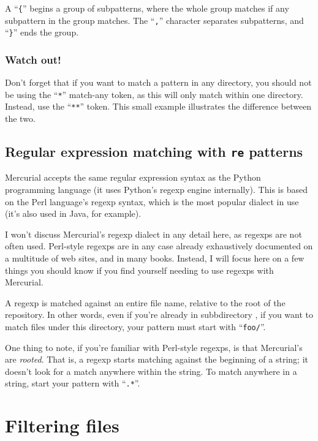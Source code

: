 A ``\texttt{\{}'' begins a group of subpatterns, where the whole group
matches if any subpattern in the group matches.  The ``\texttt{,}''
character separates subpatterns, and ``\texttt{\}}'' ends the group.

\subsubsection{Watch out!}

Don't forget that if you want to match a pattern in any directory, you
should not be using the ``\texttt{*}'' match-any token, as this will
only match within one directory.  Instead, use the ``\texttt{**}''
token.  This small example illustrates the difference between the two.

\subsection{Regular expression matching with \texttt{re} patterns}

Mercurial accepts the same regular expression syntax as the Python
programming language (it uses Python's regexp engine internally).
This is based on the Perl language's regexp syntax, which is the most
popular dialect in use (it's also used in Java, for example).

I won't discuss Mercurial's regexp dialect in any detail here, as
regexps are not often used.  Perl-style regexps are in any case
already exhaustively documented on a multitude of web sites, and in
many books.  Instead, I will focus here on a few things you should
know if you find yourself needing to use regexps with Mercurial.

A regexp is matched against an entire file name, relative to the root
of the repository.  In other words, even if you're already in
subbdirectory , if you want to match files under this
directory, your pattern must start with ``\texttt{foo/}''.

One thing to note, if you're familiar with Perl-style regexps, is that
Mercurial's are \emph{rooted}.  That is, a regexp starts matching
against the beginning of a string; it doesn't look for a match
anywhere within the string.  To match anywhere in a string, start
your pattern with ``\texttt{.*}''.

\section{Filtering files}

